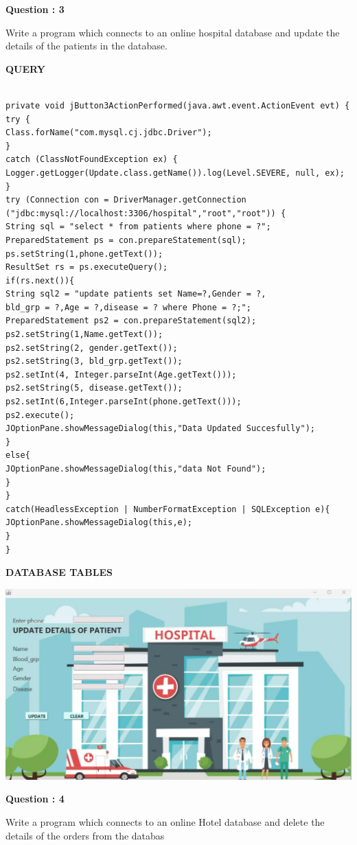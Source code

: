 \documentclass[a4paper,12pt]{report}
\begin{document}
\begin{flushleft}
    \textbf{Question : 3}
\end{flushleft}
Write a program which connects to 
an online hospital database and 
update the details of the patients in 
the database.

\begin{flushleft}
\textbf{QUERY }
\end{flushleft}
 \begin{verbatim}

private void jButton3ActionPerformed(java.awt.event.ActionEvent evt) {
try {
Class.forName("com.mysql.cj.jdbc.Driver");
}
catch (ClassNotFoundException ex) {
Logger.getLogger(Update.class.getName()).log(Level.SEVERE, null, ex);
}
try (Connection con = DriverManager.getConnection
("jdbc:mysql://localhost:3306/hospital","root","root")) {
String sql = "select * from patients where phone = ?";
PreparedStatement ps = con.prepareStatement(sql);
ps.setString(1,phone.getText());
ResultSet rs = ps.executeQuery();
if(rs.next()){
String sql2 = "update patients set Name=?,Gender = ?,
bld_grp = ?,Age = ?,disease = ? where Phone = ?;";
PreparedStatement ps2 = con.prepareStatement(sql2);
ps2.setString(1,Name.getText());
ps2.setString(2, gender.getText());
ps2.setString(3, bld_grp.getText());
ps2.setInt(4, Integer.parseInt(Age.getText()));
ps2.setString(5, disease.getText());
ps2.setInt(6,Integer.parseInt(phone.getText()));
ps2.execute();
JOptionPane.showMessageDialog(this,"Data Updated Succesfully");
}
else{
JOptionPane.showMessageDialog(this,"data Not Found");
}
}
catch(HeadlessException | NumberFormatException | SQLException e){
JOptionPane.showMessageDialog(this,e);
}
}
\end{verbatim}

\begin{flushleft}
\textbf{DATABASE TABLES}
\end{flushleft}
\includegraphics[scale=0.25]{Connectivity3.png}
\begin{flushleft}
    \textbf{Question : 4}
\end{flushleft}
Write a program which connects to 
an online Hotel database and delete 
the details of the orders from the 
databas
\end{document}
